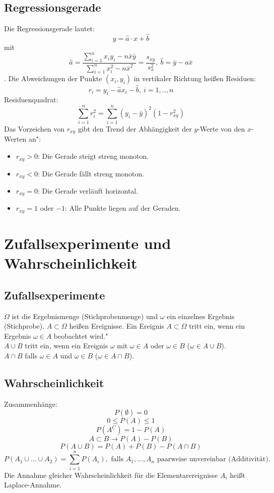 \documentclass[12pt,a4paper]{article}
\begin{document}
\subsection{Regressionsgerade}
Die Regressionsgerade lautet:
\[y = \hat{a} \cdot x + \hat{b}\]
mit
\[\hat{a} = \frac{\sum^n_{i=1}{ x_i y_i - n \bar{x} \bar{y}}}{\sum^n_{i=1}{x^2_i - n \bar{x}^2}} = \frac{s_{xy}}{s^2_x}, \ \hat{b}=\bar{y}-a \bar{x}\]
. Die Abweichungen der Punkte $(x_i, y_i)$ in vertikaler Richtung heißen Residuen:
\[r_i = y_i -\hat{a}x_i-\hat{b}, \ i = 1,..,n\]
Residuenquadrat:
\[\sum\limits^n_{i=1}{r^2_i} = \sum\limits^n_{i=1}{(y_i - \bar{y})^2 (1-r^2_{xy})}\]
\glqq Das Vorzeichen von $r_{xy}$ gibt den Trend der Abhängigkeit der $y$-Werte von den $x$-Werten an":
\begin{itemize}
\item
$r_{xy} > 0$: Die Gerade steigt streng monoton.
\item
$r_{xy} < 0$: Die Gerade fällt streng monoton.
\item
$r_{xy} = 0$: Die Gerade verläuft horizontal.
\item
$r_{xy} = 1$ oder $-1$: Alle Punkte liegen auf der Geraden.
\end{itemize}

\section{Zufallsexperimente und Wahrscheinlichkeit}
\subsection{Zufallsexperimente}
$\Omega$ ist die Ergebnismenge (Stichprobenmenge) und $\omega$ ein einzelnes Ergebnis (Stichprobe). $A \subset \Omega$ heißen Ereignisse. \glqq Ein Ereignis $A \subset \Omega$ tritt ein, wenn ein Ergebnis $\omega \in A$ beobachtet wird."\\
$A \cup B$ tritt ein, wenn ein Ereignis $\omega$ mit $\omega \in A$ oder $\omega \in B$ ($\omega \in A \cup B$).\\
$A \cap B$ falls $\omega \in A$ und $\omega \in B$ ($\omega \in A \cap B$).

\subsection{Wahrscheinlichkeit}
Zusammenhänge:
\[P(\emptyset) = 0\]
\[0 \leq P(A) \leq 1\]
\[P(A^C) = 1 - P(A)\]
\[A \subset B \rightarrow P(A) - P(B)\]
\[P(A \cup B) = P(A) + P(B) - P(A \cap B)\]
\[P(A_1 \cup ... \cup A_2) = \sum\limits_{i=1}^n{P(A_i)}, \text{ falls $A_1,...,A_n$ paarweise unvereinbar (Additivität).}\]
Die Annahme gleicher Wahrscheinlichkeit für die Elementarereignisse $A_i$ heißt Laplace-Annahme.
\end{document}
